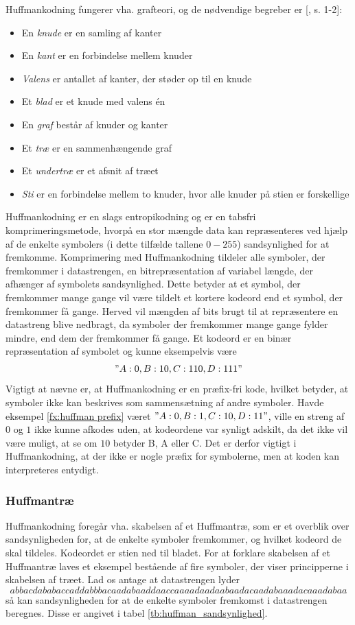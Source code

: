 Huffmankodning fungerer vha. grafteori, og de nødvendige begreber er [\citet{grafteori}, s. 1-2]:
\begin{itemize}
\item En \emph{knude} er en samling af kanter
\item En \emph{kant} er en forbindelse mellem knuder
\item \emph{Valens} er antallet af kanter, der støder op til en knude
\item Et \emph{blad} er et knude med valens én
\item En \emph{graf} består af knuder og kanter
\item Et \emph{træ} er en sammenhængende graf
\item Et \emph{undertræ} er et afsnit af træet
\item \emph{Sti} er en forbindelse mellem to knuder, hvor alle knuder på stien er forskellige
\end{itemize}
Huffmankodning er en slags entropikodning og er en tabsfri komprimeringsmetode, hvorpå en stor mængde data kan repræsenteres ved hjælp af de enkelte symbolers (i dette tilfælde tallene $0-255$) sandsynlighed for at fremkomme. Komprimering med Huffmankodning tildeler alle symboler, der fremkommer i datastrengen, en bitrepræsentation af variabel længde, der afhænger af symbolets sandsynlighed. Dette betyder at et symbol, der fremkommer mange gange vil være tildelt et kortere kodeord end et symbol, der fremkommer få gange. Herved vil mængden af bits brugt til at repræsentere en datastreng blive nedbragt, da symboler der fremkommer mange gange fylder mindre, end dem der fremkommer få gange. Et kodeord er en binær repræsentation af symbolet og kunne eksempelvis være
\begin{align}
"A: 0, B: 10, C: 110, D: 111"
\label{fx:huffman prefix}
\end{align}
Vigtigt at nævne er, at Huffmankodning er en præfix-fri kode, hvilket betyder, at symboler ikke kan beskrives som sammensætning af andre symboler. Havde eksempel \vref{fx:huffman prefix} været $"A: 0, B: 1, C: 10, D: 11"$, ville en streng af $0$ og $1$ ikke kunne afkodes uden, at kodeordene var synligt adskilt, da det ikke vil være muligt, at se om $10$ betyder B, A eller C. Det er derfor vigtigt i Huffmankodning, at der ikke er nogle præfix for symbolerne, men at koden kan interpreteres entydigt.
\subsubsection{Huffmantræ} \label{sec:huffmanteori}
Huffmankodning foregår vha. skabelsen af et Huffmantræ, som er et overblik over sandsynligheden for, at de enkelte symboler fremkommer, og hvilket kodeord de skal tildeles. Kodeordet er stien ned til bladet. For at forklare skabelsen af et Huffmantræ laves et eksempel bestående af fire symboler, der viser principperne i skabelsen af træet.
Lad os antage at datastrengen lyder $$ abbacdababaccaddabbbacaadabaaddaaccaaaadaadaabaadacaadabaaadacaaadabaa $$ så kan sandsynligheden for at de enkelte symboler fremkomst i datastrengen beregnes. Disse er angivet i tabel \ref{tb:huffman_sandsynlighed}.

